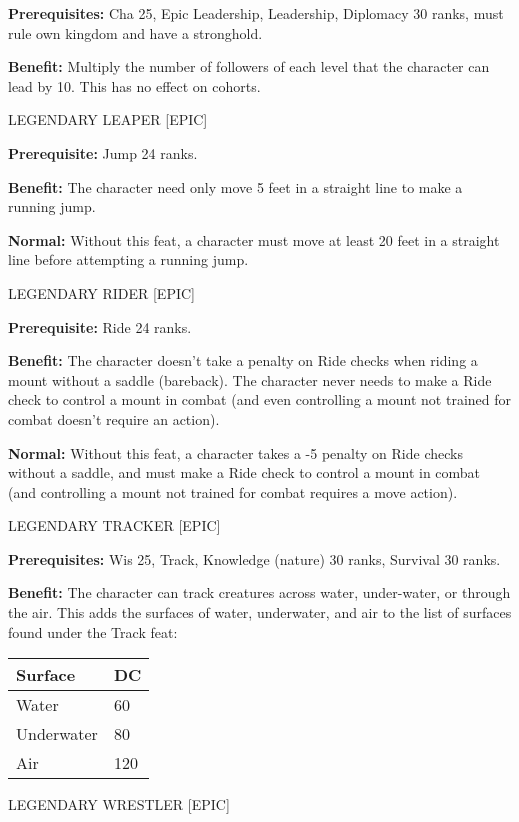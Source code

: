 \documentclass{article}
\begin{document}
\textbf{Prerequisites:} Cha 25, Epic Leadership, Leadership, Diplomacy 30 ranks, 
must rule own kingdom and have a stronghold. 

\textbf{Benefit:} Multiply the number of followers of each level that the character 
can lead by 10. This has no effect on cohorts. 

\vspace{12pt}
LEGENDARY LEAPER [EPIC] 

\textbf{Prerequisite:} Jump 24 ranks. 

\textbf{Benefit:} The character need only move 5 feet in a straight line to make 
a running jump.

\textbf{Normal:} Without this feat, a character must move at least 20 feet in a 
straight line before attempting a running jump. 

\vspace{12pt}
LEGENDARY RIDER [EPIC]

\textbf{Prerequisite:} Ride 24 ranks. 

\textbf{Benefit:} The character doesn't take a penalty on Ride checks when riding 
a mount without a saddle (bareback).  The character never needs to make a Ride 
check to control a mount in combat (and even controlling a mount not trained for 
combat doesn't require an action). 

\textbf{Normal:} Without this feat, a character takes a -5 penalty on Ride checks 
without a saddle, and must make a Ride check to control a mount in combat (and 
controlling a mount not trained for combat requires a move action). 

\vspace{12pt}
LEGENDARY TRACKER [EPIC] 

\textbf{Prerequisites:} Wis 25, Track, Knowledge (nature) 30 ranks, Survival 30 
ranks. 

\textbf{Benefit:} The character can track creatures across water, under-water, 
or through the air. This adds the surfaces of water, underwater, and air to the 
list of surfaces found under the Track feat: 

\begin{tabular}{|>{\raggedright}p{46pt}|>{\raggedright}p{13pt}|}
\hline
S\textbf{urface} & D\textbf{C }\tabularnewline
\hline
Water & 60 \tabularnewline
\hline
Underwater & 80 \tabularnewline
\hline
Air & 120 \tabularnewline
\hline
\end{tabular}

\vspace{12pt}
LEGENDARY WRESTLER [EPIC] 
\end{document}
